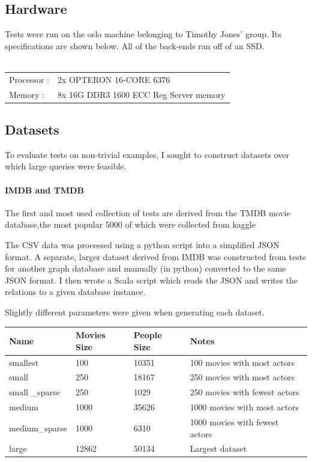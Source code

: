 \documentclass[12pt,a4paper,twoside,openright]{report}
\begin{document}
	\subsection{Hardware}
	Tests were run on the oslo machine belonging to Timothy Jones' group. Its specifications are shown below. All of the back-ends ran off of an SSD.
\\\\	\begin{tabular}{|p{5cm}p{10cm}|}
	\hline
		Processor : & 2x OPTERON 16-CORE 6376 \\
		Memory : & 8x 16G DDR3 1600 ECC Reg Server memory\\
	\hline
	\end{tabular}
	\subsection{Datasets}
	To evaluate tests on non-trivial examples, I sought to construct datasets over which large queries were feasible.

		\paragraph{IMDB and TMDB}
		The first and most used collection of tests are derived from the TMDB movie database,the most popular 5000 of which were collected from kaggle \cite{TMDB5000}

The CSV data was processed using a python script into a simplified JSON format. A separate, larger dataset derived from IMDB was constructed from tests for another graph database \cite{IMDB} and manually (in python) converted to the same JSON format. I then wrote a Scala script which reads the JSON and writes the relations to a given database instance.

Slightly different parameters were given when generating each dataset.

\begin{center}
	\begin{tabular}{ |p{3cm}||p{3cm}|p{3cm}||p{3cm}|  }	
	\hline
        Name & Movies Size & People Size & Notes \\ \hline
        smallest & 100 & 10351 & 100 movies with most actors \\ \hline
        small & 250 & 18167 & 250 movies with most actors \\ \hline
        small _sparse & 250 & 1029 & 250 movies with fewest actors \\ \hline
        medium & 1000 & 35626 & 1000 movies with most actors \\ \hline
        medium_sparse & 1000 & 6310 & 1000 movies with fewest actors \\ \hline 
       large & 12862 & 50134 & Largest dataset \\ \hline
	\end{tabular}
\end{center}
\end{document}
